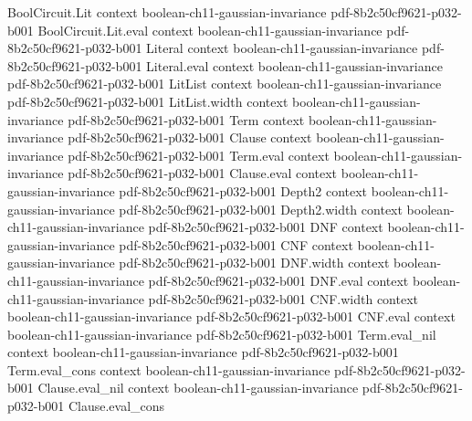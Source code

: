 \begin{theorem}
\label{BooleanAnalysis.GaussianSpace.carbery_wright}
\leanok
{}
\proofstep
  {BoolCircuit.Lit}
  {context}
  {boolean-ch11-gaussian-invariance}
  {pdf-8b2c50cf9621-p032-b001}
\proofstep
  {BoolCircuit.Lit.eval}
  {context}
  {boolean-ch11-gaussian-invariance}
  {pdf-8b2c50cf9621-p032-b001}
\proofstep
  {Literal}
  {context}
  {boolean-ch11-gaussian-invariance}
  {pdf-8b2c50cf9621-p032-b001}
\proofstep
  {Literal.eval}
  {context}
  {boolean-ch11-gaussian-invariance}
  {pdf-8b2c50cf9621-p032-b001}
\proofstep
  {LitList}
  {context}
  {boolean-ch11-gaussian-invariance}
  {pdf-8b2c50cf9621-p032-b001}
\proofstep
  {LitList.width}
  {context}
  {boolean-ch11-gaussian-invariance}
  {pdf-8b2c50cf9621-p032-b001}
\proofstep
  {Term}
  {context}
  {boolean-ch11-gaussian-invariance}
  {pdf-8b2c50cf9621-p032-b001}
\proofstep
  {Clause}
  {context}
  {boolean-ch11-gaussian-invariance}
  {pdf-8b2c50cf9621-p032-b001}
\proofstep
  {Term.eval}
  {context}
  {boolean-ch11-gaussian-invariance}
  {pdf-8b2c50cf9621-p032-b001}
\proofstep
  {Clause.eval}
  {context}
  {boolean-ch11-gaussian-invariance}
  {pdf-8b2c50cf9621-p032-b001}
\proofstep
  {Depth2}
  {context}
  {boolean-ch11-gaussian-invariance}
  {pdf-8b2c50cf9621-p032-b001}
\proofstep
  {Depth2.width}
  {context}
  {boolean-ch11-gaussian-invariance}
  {pdf-8b2c50cf9621-p032-b001}
\proofstep
  {DNF}
  {context}
  {boolean-ch11-gaussian-invariance}
  {pdf-8b2c50cf9621-p032-b001}
\proofstep
  {CNF}
  {context}
  {boolean-ch11-gaussian-invariance}
  {pdf-8b2c50cf9621-p032-b001}
\proofstep
  {DNF.width}
  {context}
  {boolean-ch11-gaussian-invariance}
  {pdf-8b2c50cf9621-p032-b001}
\proofstep
  {DNF.eval}
  {context}
  {boolean-ch11-gaussian-invariance}
  {pdf-8b2c50cf9621-p032-b001}
\proofstep
  {CNF.width}
  {context}
  {boolean-ch11-gaussian-invariance}
  {pdf-8b2c50cf9621-p032-b001}
\proofstep
  {CNF.eval}
  {context}
  {boolean-ch11-gaussian-invariance}
  {pdf-8b2c50cf9621-p032-b001}
\proofstep
  {Term.eval_nil}
  {context}
  {boolean-ch11-gaussian-invariance}
  {pdf-8b2c50cf9621-p032-b001}
\proofstep
  {Term.eval_cons}
  {context}
  {boolean-ch11-gaussian-invariance}
  {pdf-8b2c50cf9621-p032-b001}
\proofstep
  {Clause.eval_nil}
  {context}
  {boolean-ch11-gaussian-invariance}
  {pdf-8b2c50cf9621-p032-b001}
\proofstep
  {Clause.eval_cons}

\end{theorem}
